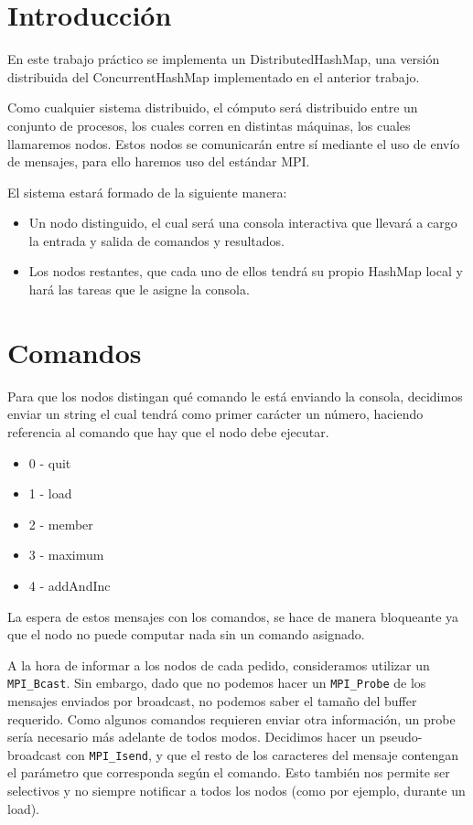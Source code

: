 \section{Introducción}

En este trabajo práctico se implementa un DistributedHashMap, una versión distribuida del ConcurrentHashMap implementado en el anterior trabajo.

Como cualquier sistema distribuido, el cómputo será distribuido entre un conjunto de procesos, los cuales corren en distintas máquinas, los cuales llamaremos nodos. Estos nodos se comunicarán entre sí mediante el uso de envío de mensajes, para ello haremos uso del estándar MPI.

El sistema estará formado de la siguiente manera:
\begin{itemize}
\item Un nodo distinguido, el cual será una consola interactiva que llevará a cargo la entrada y salida de comandos y resultados.
\item Los nodos restantes, que cada uno de ellos tendrá su propio HashMap local y hará las tareas que le asigne la consola.
\end{itemize}

\section{Comandos}

Para que los nodos distingan qué comando le está enviando la consola, decidimos enviar un string el cual tendrá como primer carácter un número, haciendo referencia al comando que hay que el nodo debe ejecutar.

\begin{itemize}
\item 0 - quit
\item 1 - load
\item 2 - member
\item 3 - maximum
\item 4 - addAndInc
\end{itemize}

La espera de estos mensajes con los comandos, se hace de manera bloqueante ya que el nodo no puede computar nada sin un comando asignado.

A la hora de informar a los nodos de cada pedido, consideramos utilizar un \texttt{MPI\_Bcast}. Sin embargo, dado que no podemos hacer un \texttt{MPI\_Probe} de los mensajes enviados por broadcast, no podemos saber el tamaño del buffer requerido. Como algunos comandos requieren enviar otra información, un probe sería necesario más adelante de todos modos. Decidimos hacer un pseudo-broadcast con \texttt{MPI\_Isend}, y que el resto de los caracteres del mensaje contengan el parámetro que corresponda según el comando. Esto también nos permite ser selectivos y no siempre notificar a todos los nodos (como por ejemplo, durante un load).

